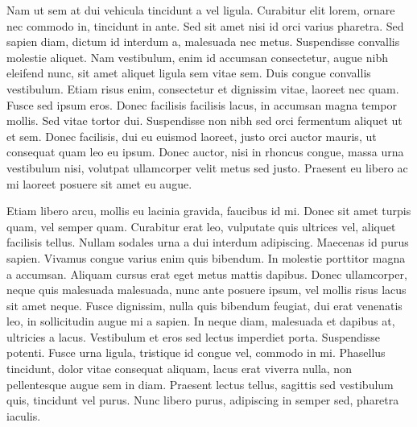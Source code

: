 Nam ut sem at dui vehicula tincidunt a vel ligula. Curabitur elit lorem, ornare nec commodo in, tincidunt in ante. Sed sit amet nisi id orci varius pharetra. Sed sapien diam, dictum id interdum a, malesuada nec metus. Suspendisse convallis molestie aliquet. Nam vestibulum, enim id accumsan consectetur, augue nibh eleifend nunc, sit amet aliquet ligula sem vitae sem. Duis congue convallis vestibulum. Etiam risus enim, consectetur et dignissim vitae, laoreet nec quam. Fusce sed ipsum eros. Donec facilisis facilisis lacus, in accumsan magna tempor mollis. Sed vitae tortor dui. Suspendisse non nibh sed orci fermentum aliquet ut et sem. Donec facilisis, dui eu euismod laoreet, justo orci auctor mauris, ut consequat quam leo eu ipsum. Donec auctor, nisi in rhoncus congue, massa urna vestibulum nisi, volutpat ullamcorper velit metus sed justo. Praesent eu libero ac mi laoreet posuere sit amet eu augue.

Etiam libero arcu, mollis eu lacinia gravida, faucibus id mi. Donec sit amet turpis quam, vel semper quam. Curabitur erat leo, vulputate quis ultrices vel, aliquet facilisis tellus. Nullam sodales urna a dui interdum adipiscing. Maecenas id purus sapien. Vivamus congue varius enim quis bibendum. In molestie porttitor magna a accumsan. Aliquam cursus erat eget metus mattis dapibus. Donec ullamcorper, neque quis malesuada malesuada, nunc ante posuere ipsum, vel mollis risus lacus sit amet neque. Fusce dignissim, nulla quis bibendum feugiat, dui erat venenatis leo, in sollicitudin augue mi a sapien. In neque diam, malesuada et dapibus at, ultricies a lacus. Vestibulum et eros sed lectus imperdiet porta. Suspendisse potenti. Fusce urna ligula, tristique id congue vel, commodo in mi. Phasellus tincidunt, dolor vitae consequat aliquam, lacus erat viverra nulla, non pellentesque augue sem in diam. Praesent lectus tellus, sagittis sed vestibulum quis, tincidunt vel purus. Nunc libero purus, adipiscing in semper sed, pharetra iaculis. 
